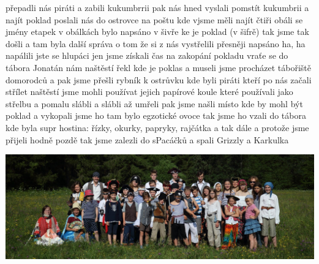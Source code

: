 přepadli nás piráti a zabili kukumbrrii pak nás hned vyslali pomstít kukumbrii a najít poklad poslali nás do ostrovce na poštu kde vjsme měli najít čtiři obáli se jmény etapek v obálkách bylo napsáno v šivře ke je poklad (v šifrě) tak jsme tak došli a tam byla další správa o tom že si z nás vystřelili přesněji napsáno ha, ha napálili jste se hlupáci jen jsme získali čas na zakopání pokladu vraťe se do tábora Jonatán nám naštěstí řekl kde je poklas a museli jsme procházet tábořiště domorodců a pak jsme přešli rybník k ostrůvku kde byli piráti kteří po nás začali střílet naštěstí jsme mohli používat jejich papírové koule které používali jako střelbu a pomalu slábli a slábli až umřeli pak jsme našli místo kde by mohl být poklad a vykopali jsme ho tam bylo egzotické ovoce tak jsme ho vzali do tábora kde byla supr hostina: řízky, okurky, papryky, rajčátka a tak dále a protože jsme přijeli hodně pozdě tak jsme zalezli do sPacáčků a spali Grizzly a Karkulka



\begin{center}
	\includegraphics[width=\textwidth]{img/anpetu_tabor/spolecna.JPG}
\end{center}
\clearpage